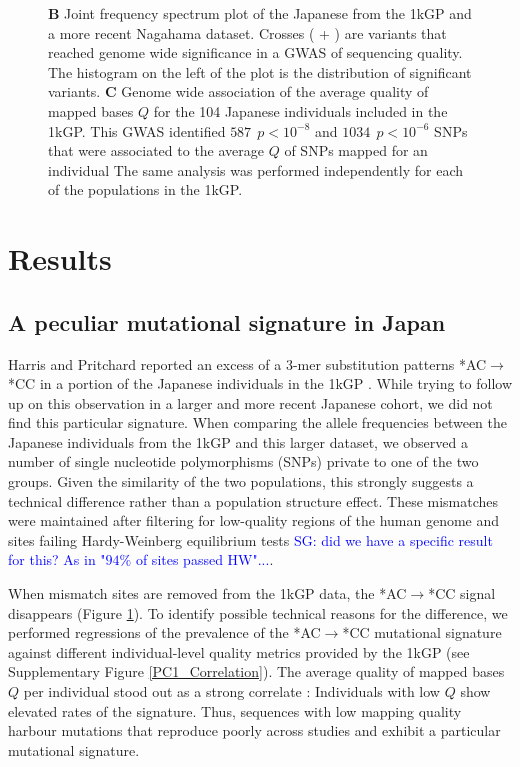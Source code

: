 \documentclass[9pt,lineno]{elife}
\newcommand{\sgcomment}[1]{\textcolor{blue}{SG: #1}}
\begin{document}
\begin{figure}
{\textbf{B} 
Joint frequency spectrum plot of the Japanese from the 1kGP and a more recent Nagahama dataset.
Crosses ( + ) are variants that reached genome wide significance in a GWAS of sequencing quality. 
The histogram on the left of the plot is the distribution of significant variants. 
\textbf{C} 
Genome wide association of the average quality of mapped bases $Q$ for the 104 Japanese individuals included in the 1kGP. This GWAS identified $587\ \  p < 10^{-8}$ and $1034\ \ p < 10^{-6}$ SNPs that were associated to the average $Q$ of SNPs mapped for an individual
The same analysis was performed independently for each of the populations in the 1kGP. }
 \label{SFS}
\end{figure}


\section{Results}

			
\subsection{A peculiar mutational signature in Japan}			
	
Harris and Pritchard reported an excess of a 3-mer substitution patterns *AC${\rightarrow}$*CC in a portion of the Japanese individuals in the 1kGP \citep{Harris2017a}.
While trying to follow up on this observation in a larger and more recent Japanese cohort, we did not find this particular signature.
When comparing the allele frequencies between the Japanese individuals from the 1kGP and this larger dataset, we observed a number of single nucleotide polymorphisms (SNPs) private to one of the two groups.
Given the similarity of the two populations, this strongly suggests a technical difference rather than a population structure effect.
These mismatches were maintained after filtering for low-quality regions of the human genome and sites failing Hardy-Weinberg equilibrium tests \sgcomment{did we have a specific result for this? As in "$94\%$ of sites passed HW"...}. 


When mismatch sites are removed from the 1kGP data, the  *AC${\rightarrow}$*CC signal disappears (Figure \ref{SFS}). To identify possible technical reasons for the difference, we performed regressions of the prevalence of the  *AC${\rightarrow}$*CC mutational signature against different individual-level quality metrics provided by the 1kGP (see Supplementary Figure \ref{PC1_Correlation}). The average quality of mapped bases  $Q$ per individual stood out as a strong correlate : Individuals with low $Q$ show elevated rates of the signature. %
Thus, sequences with low mapping quality harbour mutations that reproduce poorly across studies and exhibit a particular mutational signature. 
\end{document}
